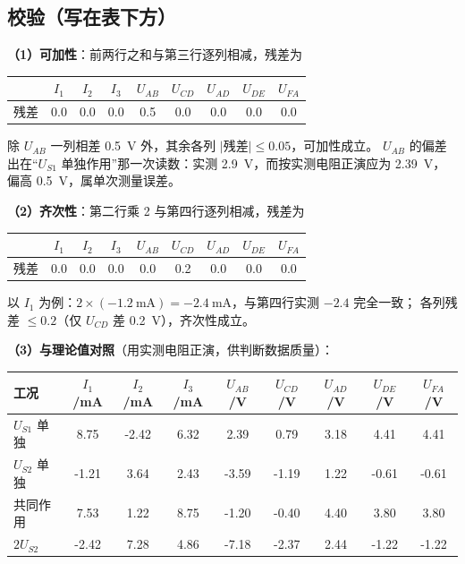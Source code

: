 \documentclass[UTF8,a4paper,10.5pt]{ctexart}
\newcommand{\ok}[1]{\textcolor{okc}{#1}}
\begin{document}
\subsection*{校验（写在表下方）}
\noindent\textbf{（1）可加性}：前两行之和与第三行逐列相减，残差为
\begin{center}
\scriptsize\setlength{\tabcolsep}{4pt}
\begin{tabular}{@{}l*{8}{c}@{}}
\toprule
 & $I_1$ & $I_2$ & $I_3$ & $U_{AB}$ & $U_{CD}$ & $U_{AD}$ & $U_{DE}$ & $U_{FA}$\\
\midrule
残差 & 0.0 & 0.0 & 0.0 & 0.5 & 0.0 & 0.0 & 0.0 & 0.0\\
\bottomrule
\end{tabular}
\end{center}
除 $U_{AB}$ 一列相差 0.5~V 外，其余各列 $|$残差$|\le0.05$，\ok{可加性成立}。
$U_{AB}$ 的偏差出在“$U_{S1}$ 单独作用”那一次读数：实测 2.9~V，而按实测电阻正演应为 2.39~V，
偏高 0.5~V，属单次测量误差。

\noindent\textbf{（2）齐次性}：第二行乘 2 与第四行逐列相减，残差为
\begin{center}
\scriptsize\setlength{\tabcolsep}{4pt}
\begin{tabular}{@{}l*{8}{c}@{}}
\toprule
 & $I_1$ & $I_2$ & $I_3$ & $U_{AB}$ & $U_{CD}$ & $U_{AD}$ & $U_{DE}$ & $U_{FA}$\\
\midrule
残差 & 0.0 & 0.0 & 0.0 & 0.0 & 0.2 & 0.0 & 0.0 & 0.0\\
\bottomrule
\end{tabular}
\end{center}
以 $I_1$ 为例：$2\times(-1.2\ \text{mA})=-2.4\ \text{mA}$，与第四行实测 $-2.4$ 完全一致；
各列残差 $\le0.2$（仅 $U_{CD}$ 差 0.2~V），\ok{齐次性成立}。

\noindent\textbf{（3）与理论值对照}（用实测电阻正演，供判断数据质量）：
\begin{center}
\scriptsize\setlength{\tabcolsep}{3.6pt}
\begin{tabular}{@{}l*{8}{c}@{}}
\toprule
工况 & $I_1$/mA & $I_2$/mA & $I_3$/mA & $U_{AB}$/V & $U_{CD}$/V & $U_{AD}$/V & $U_{DE}$/V & $U_{FA}$/V\\
\midrule
$U_{S1}$ 单独 & 8.75 & -2.42 & 6.32 & 2.39 & 0.79 & 3.18 & 4.41 & 4.41 \\
$U_{S2}$ 单独 & -1.21 & 3.64 & 2.43 & -3.59 & -1.19 & 1.22 & -0.61 & -0.61 \\
共同作用 & 7.53 & 1.22 & 8.75 & -1.20 & -0.40 & 4.40 & 3.80 & 3.80 \\
$2U_{S2}$ & -2.42 & 7.28 & 4.86 & -7.18 & -2.37 & 2.44 & -1.22 & -1.22 \\
\bottomrule
\end{tabular}
\end{center}
\end{document}
